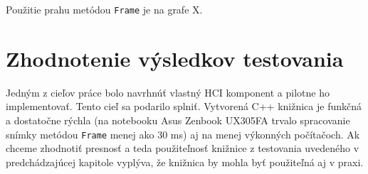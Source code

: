 Použitie prahu metódou \texttt{Frame} je na grafe X.

\section{Zhodnotenie výsledkov testovania}
Jedným z cieľov práce bolo navrhnúť vlastný HCI komponent a pilotne ho implementovať.
Tento cieľ sa podarilo splniť.
Vytvorená C++ knižnica je funkčná a dostatočne rýchla (na notebooku Asus  Zenbook UX305FA trvalo spracovanie snímky metódou \texttt{Frame} menej ako 30 ms) aj na menej výkonných počítačoch.  
Ak chceme zhodnotiť presnosť a teda použiteľnosť knižnice z testovania uvedeného v predchádzajúcej kapitole vyplýva, že knižnica by mohla byť použiteľná aj v praxi.